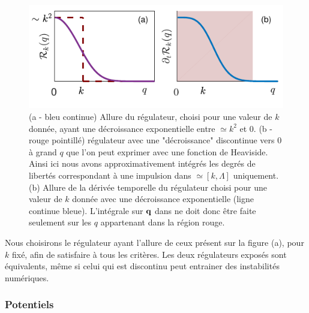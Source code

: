 \documentclass[10pt]{article}
\begin{document}
\begin{multicols}{2}
\begin{figure}[H]
\begin{center}
	\includegraphics[width=0.95\columnwidth]{RegDerReg.pdf}
\end{center}
\vspace*{-22pt}
\caption{(a - bleu continue) Allure du régulateur, choisi pour une valeur de $k$ donnée, ayant une décroissance exponentielle entre $\simeq k^2$ et $0$. (b - rouge pointillé) régulateur avec une "décroissance" discontinue vers $0$ à grand $q$ que l'on peut exprimer avec une fonction de Heaviside. Ainsi ici nous avons approximativement intégrés les degrés de libertés correspondant à une impulsion dans $\simeq [k,\Lambda]$ uniquement. (b) Allure de la dérivée temporelle du régulateur choisi pour une valeur de $k$ donnée avec une décroissance exponentielle (ligne continue bleue). L'intégrale sur ${\bf q}$ dans  ne doit donc être faite seulement sur les $q$ appartenant dans la région rouge.}
\label{fig:RegDerReg}
\end{figure}


Nous choisirons le régulateur ayant l'allure de ceux présent sur la figure  (a), pour $k$ fixé, afin de satisfaire à tous les critères. Les deux régulateurs exposés sont équivalents, même si celui qui est discontinu peut entrainer des instabilités numériques.




\vspace*{11pt}
\subsubsection{Potentiels}


\end{multicols}
\end{document}

